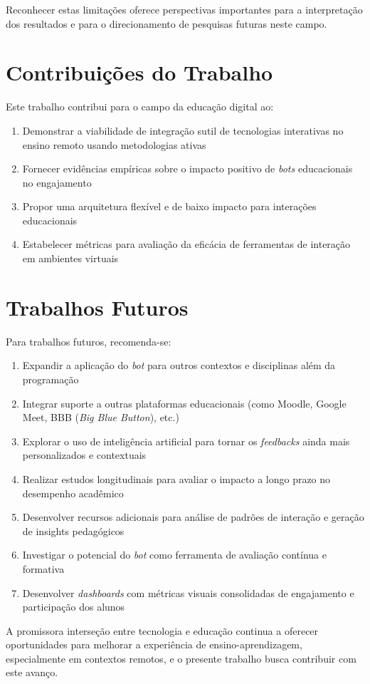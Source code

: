 Reconhecer estas limitações oferece perspectivas importantes para a
interpretação dos resultados e para o direcionamento de pesquisas futuras neste
campo.

\section{Contribuições do Trabalho}
\label{sec:contribuicoes}

Este trabalho contribui para o campo da educação digital ao:

\begin{enumerate}
\item Demonstrar a viabilidade de integração sutil de tecnologias interativas no
ensino remoto usando metodologias ativas
\item Fornecer evidências empíricas sobre o impacto positivo de \textit{bots} 
educacionais no engajamento
\item Propor uma arquitetura flexível e de baixo impacto para interações
educacionais
\item Estabelecer métricas para avaliação da eficácia de ferramentas de
interação em ambientes virtuais
\end{enumerate}

\section{Trabalhos Futuros}
\label{sec:trabalhos-futuros}

Para trabalhos futuros, recomenda-se:

\begin{enumerate}
\item Expandir a aplicação do \textit{bot} para outros contextos e disciplinas
além da programação
\item Integrar suporte a outras plataformas educacionais (como Moodle, Google
Meet, BBB (\textit{Big Blue Button}), etc.)
\item Explorar o uso de inteligência artificial para tornar os
\textit{feedbacks} ainda mais personalizados e contextuais
\item Realizar estudos longitudinais para avaliar o impacto a longo prazo no
desempenho acadêmico
\item Desenvolver recursos adicionais para análise de padrões de interação e
geração de insights pedagógicos
\item Investigar o potencial do \textit{bot} como ferramenta de avaliação
contínua e formativa
\item Desenvolver \textit{dashboards} com métricas visuais consolidadas de
engajamento e participação dos alunos
\end{enumerate}

A promissora interseção entre tecnologia e educação continua a oferecer
oportunidades para melhorar a experiência de ensino-aprendizagem, especialmente
em contextos remotos, e o presente trabalho busca contribuir com este avanço.
